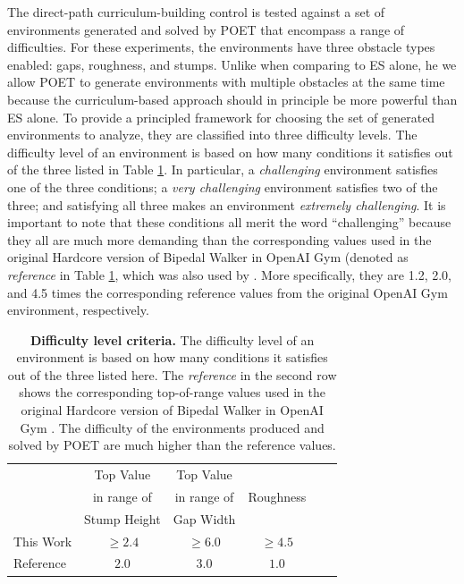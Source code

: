 \documentclass{article}
\begin{document}
The direct-path curriculum-building control is tested against a set of environments generated and solved by POET that encompass a range of difficulties. 
For these experiments, the environments have three obstacle types enabled: gaps, roughness, and stumps.
Unlike when comparing to ES alone, he we allow POET to generate environments with multiple obstacles at the same time because the curriculum-based approach should in principle be more powerful than ES alone.
To provide a principled framework for choosing the set of generated environments to analyze, they are classified into three difficulty levels. 
The difficulty level of an environment is based on how many conditions it satisfies out of the three listed in Table \ref{challenge-table}.
In particular, a \emph{challenging} environment satisfies one of the three conditions; a \emph{very challenging} environment satisfies two of the three; and satisfying all three makes an environment \emph{extremely challenging}.
It is important to note that these conditions all merit the word ``challenging'' because they all are much more demanding than the corresponding values used in the original Hardcore version of Bipedal Walker in OpenAI Gym \cite{OpenAI_bipedal} (denoted as \emph{reference} in Table \ref{challenge-table}, which was also used by \citet{davidha:arxiv18}.  More specifically, they are 1.2, 2.0, and 4.5 times the corresponding reference values from the original OpenAI Gym environment, respectively. 

\begin{table}[H]
\begin{center}
\begin{small}
\begin{sc}
\begin{tabular}{lccccc}
\hline
 & Top Value & Top Value &  \\
 & in range of &  in range of & Roughness \\
 & Stump Height & Gap Width & \\
\hline
This Work & $\geq2.4$ & $\geq6.0$ &  $\geq4.5$\\
Reference & $2.0$ & $3.0$ & $1.0$\\
\hline
\end{tabular}
\end{sc}
\end{small}
\end{center}
\caption{\textbf{Difficulty level criteria.} The difficulty level of an environment is based on how many conditions it satisfies out of the three listed here. The \emph{reference} in the second row shows the corresponding top-of-range values used in the original Hardcore version of Bipedal Walker in OpenAI Gym \cite{OpenAI_bipedal}. The  difficulty of the environments produced and solved by POET are much higher than the reference values.}\label{challenge-table}
\vskip -0.1in
\end{table}
\end{document}
